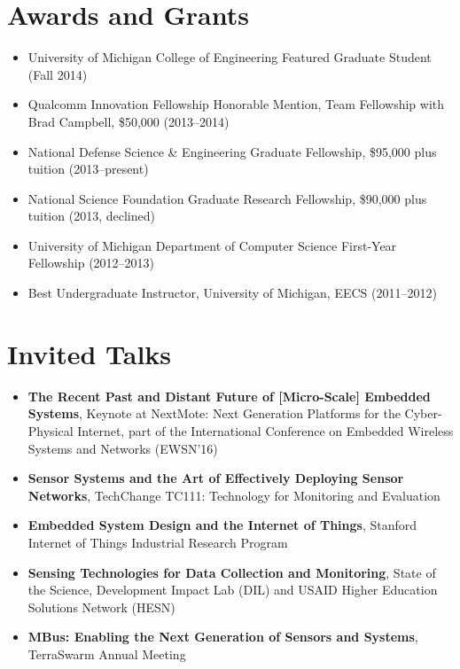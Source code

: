 \documentclass{article}
\begin{document}
\section*{Awards and Grants}

\begin{itemize}

  \item[] University of Michigan College of Engineering Featured Graduate Student (Fall 2014)
  \item[] Qualcomm Innovation Fellowship Honorable Mention, Team Fellowship with Brad Campbell, \$50,000 (2013--2014)
  \item[] National Defense Science \& Engineering Graduate Fellowship, \$95,000 plus tuition (2013--present)
  \item[] National Science Foundation Graduate Research Fellowship, \$90,000 plus tuition (2013, declined)
  \item[] University of Michigan Department of Computer Science First-Year Fellowship (2012--2013)
  \item[] Best Undergraduate Instructor, University of Michigan, EECS (2011--2012)

\end{itemize}

\section*{Invited Talks}

\begin{itemize}
  \item[] \textbf{The Recent Past and Distant Future of [Micro-Scale] Embedded Systems},
    Keynote at NextMote: Next Generation Platforms for the Cyber-Physical Internet,
    part of the International Conference on Embedded Wireless Systems and Networks (EWSN'16)
  \item[] \textbf{Sensor Systems and the Art of Effectively Deploying Sensor Networks},
    TechChange TC111: Technology for Monitoring and Evaluation
  \item[] \textbf{Embedded System Design and the Internet of Things},
    Stanford Internet of Things Industrial Research Program
  \item[] \textbf{Sensing Technologies for Data Collection and Monitoring},
    State of the Science, Development Impact Lab (DIL) and USAID Higher Education Solutions Network (HESN)
  \item[] \textbf{MBus: Enabling the Next Generation of Sensors and Systems},
    TerraSwarm Annual Meeting
\end{itemize}
\end{document}
